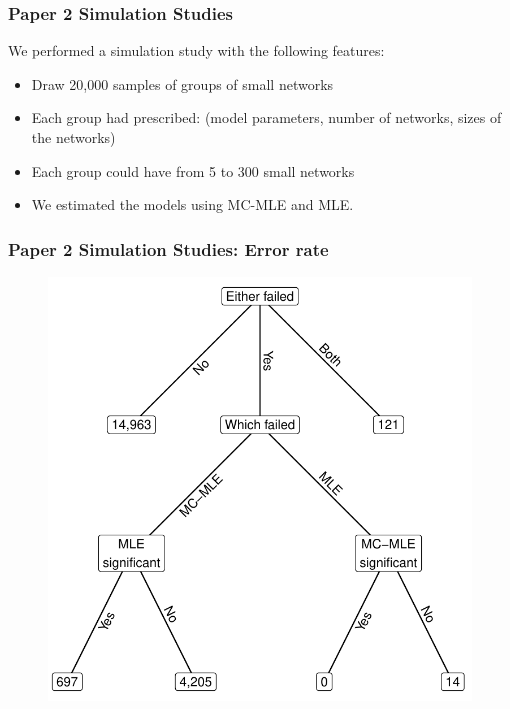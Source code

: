 \documentclass[aspectratio=169, 9pt]{beamer}\usepackage[]{graphicx}\usepackage[]{color}
\begin{document}
\begin{frame}[label=ergmitodgp]
\frametitle{Paper 2 Simulation Studies}

We performed a simulation study with the following features:

\begin{itemize}[<+->]
\item Draw 20,000 samples of groups of small networks
\item Each group had prescribed: (model parameters, number of networks, sizes of the networks)
\item Each group could have from 5 to 300 small networks
\item We estimated the models using MC-MLE and MLE.
\end{itemize}

\vfill\hfill\hyperlink{ergmitoexample}{}

\end{frame}

\begin{frame}[label=ergmsims,allowframebreaks]
\frametitle{Paper 2 Simulation Studies: Error rate}

\begin{figure}
\centering
\includegraphics[width=.4\linewidth]{failed-tree.pdf}
\end{figure}

\hyperlink{ergmitoexperiment}{}

\end{frame}
\end{document}
